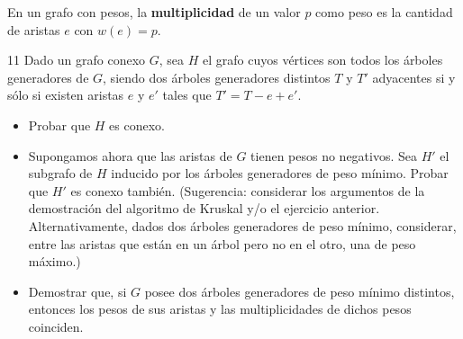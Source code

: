 \begin{definition}
    En un grafo con pesos, la \textbf{multiplicidad} de un valor \( p \) como peso es la cantidad de aristas \( e \) con \( w(e) = p \).
\end{definition}

\begin{ejercicio}{11}
    Dado un grafo conexo \( G \), sea \( H \) el grafo cuyos vértices son todos los árboles generadores de \( G \), siendo dos árboles generadores distintos \( T \) y \( T' \) adyacentes si y sólo si existen aristas \( e \) y \( e' \) tales que \( T' = T - e + e' \).
    \begin{itemize}
        \item Probar que \( H \) es conexo.
        \item Supongamos ahora que las aristas de \( G \) tienen pesos no negativos. Sea \( H' \) el subgrafo de \( H \) inducido por los árboles generadores de peso mínimo. Probar que \( H' \) es conexo también. (Sugerencia: considerar los argumentos de la demostración del algoritmo de Kruskal y/o el ejercicio anterior. Alternativamente, dados dos árboles generadores de peso mínimo, considerar, entre las aristas que están en un árbol pero no en el otro, una de peso máximo.)
        \item Demostrar que, si \( G \) posee dos árboles generadores de peso mínimo distintos, entonces los pesos de sus aristas y las multiplicidades de dichos pesos coinciden.
    \end{itemize}
\end{ejercicio}
